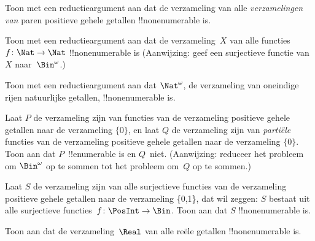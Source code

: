 \documentclass[../../../include/open-logic-section]{subfiles}
\begin{document}
\begin{prob}
Toon met een reductieargument aan dat de verzameling van alle
\emph{verzamelingen van} paren positieve gehele getallen
!!{nonenumerable} is.
\end{prob}

\begin{prob}\label{sfr:siz:red:prob:nat-nat}
  Toon met een reductieargument aan dat de verzameling~$X$ van alle
  functies $f\colon \Nat \to \Nat$ !!{nonenumerable} is (Aanwijzing:
  geef een surjectieve functie van $X$ naar~$\Bin^\omega$.)
\end{prob}

\begin{prob}
Toon met een reductieargument aan dat $\Nat^\omega$, de verzameling van
oneindige rijen natuurlijke getallen, !!{nonenumerable} is.
\end{prob}

\begin{prob}
Laat $P$ de verzameling zijn van functies van de verzameling positieve
gehele getallen naar de verzameling $\{0\}$, en laat $Q$ de verzameling
zijn van \emph{partiële} functies van de verzameling positieve gehele
getallen naar de verzameling $\{0\}$. Toon aan dat $P$~!!{enumerable}
is en $Q$~niet. (Aanwijzing: reduceer het probleem om $\Bin^\omega$ op
te sommen tot het probleem om~$Q$ op te sommen.)
\end{prob}

\begin{prob}
Laat $S$ de verzameling zijn van alle surjectieve functies van de
verzameling positieve gehele getallen naar de verzameling \{0,1\}, dat
wil zeggen: $S$ bestaat uit alle surjectieve functies~$f\colon
\PosInt \to \Bin$. Toon aan dat $S$ !!{nonenumerable} is.
\end{prob}

\begin{prob}
Toon aan dat de verzameling~$\Real$ van alle reële getallen
!!{nonenumerable} is.
\end{prob}
\end{document}
